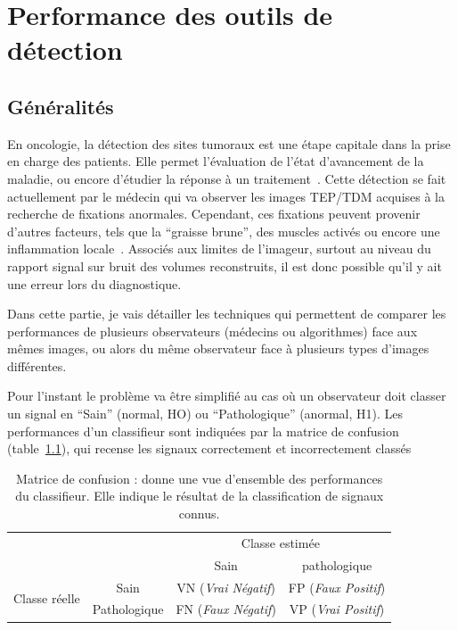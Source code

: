 \chapter{Performance des outils de détection }
\label{lab:chapCAD}
	\section{Généralités}

En oncologie, la détection des sites tumoraux est une étape capitale dans la prise en charge des patients. Elle permet l'évaluation de l'état d'avancement de la maladie, ou encore d'étudier la réponse à un traitement~\cite{dimitrakopoulou2002role}. Cette détection se fait actuellement par le médecin qui va observer les images TEP/TDM acquises à la recherche de fixations anormales. Cependant, ces fixations peuvent provenir d'autres facteurs, tels que la ``graisse brune'', des muscles activés ou encore une inflammation locale~\cite{bordessoule2006impact}. Associés aux limites de l'imageur, surtout au niveau du rapport signal sur bruit des volumes reconstruits, il est donc possible qu'il y ait une erreur lors du diagnostique.

Dans cette partie, je vais détailler les techniques qui permettent de comparer les performances de plusieurs observateurs (médecins ou algorithmes) face aux mêmes images, ou alors du même observateur face à plusieurs types d'images différentes.

Pour l'instant le problème va être simplifié au cas où un observateur doit classer un signal en ``Sain'' (normal, HO) ou ``Pathologique'' (anormal, H1).
Les performances d'un classifieur sont indiquées par la matrice de confusion (table~\ref{tab:confusion}), qui recense les signaux correctement et incorrectement classés 

\begin{table}[h]
	\label{tab:confusion}
	\begin{tabular}{cc c|c|}
		& & \multicolumn{2}{c}{Classe estimée} \\
		\cline{3-4}	
		& & \multicolumn{1}{|c|}{Sain} & pathologique \\ 
		\cline{2-4}
		\multicolumn{1}{c|}{\multirow{2}{*}{Classe réelle}} & \multicolumn{1}{|c|}{Sain} & VN (\emph{Vrai Négatif}) & FP (\emph{Faux Positif})\\
		\cline{2-4}
		\multicolumn{1}{c|}{} & \multicolumn{1}{|c|}{Pathologique} & FN (\emph{Faux Négatif}) & VP (\emph{Vrai Positif})\\
		\cline{2-4}
	\end{tabular}
	\caption{Matrice de confusion : donne une vue d'ensemble des performances du classifieur. Elle indique le résultat de la classification de signaux connus.}
\end{table}

